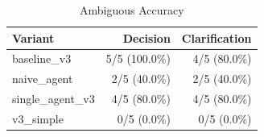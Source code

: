 \begin{table}[htbp]
\centering
\caption{Ambiguous Accuracy}
\label{tab:acc-ambig}
\begin{tabular}{l rr}
\toprule
Variant & Decision & Clarification \\
\midrule
  baseline\_v3 & 5/5 (100.0\%) & 4/5 (80.0\%) \\
  naive\_agent & 2/5 (40.0\%) & 2/5 (40.0\%) \\
  single\_agent\_v3 & 4/5 (80.0\%) & 4/5 (80.0\%) \\
  v3\_simple & 0/5 (0.0\%) & 0/5 (0.0\%) \\
\bottomrule
\end{tabular}
\end{table}
